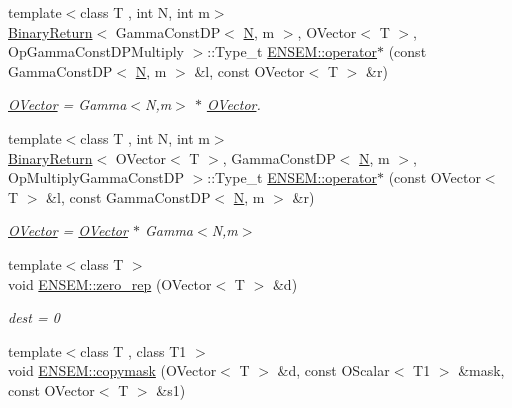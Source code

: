 \begin{DoxyCompactItemize}
{\footnotesize template$<$class T , int N, int m$>$ }\\\mbox{\hyperlink{structBinaryReturn}{Binary\+Return}}$<$ Gamma\+Const\+DP$<$ \mbox{\hyperlink{adat__devel_2lib_2hadron_2operator__name__util_8cc_a7722c8ecbb62d99aee7ce68b1752f337}{N}}, m $>$, O\+Vector$<$ T $>$, Op\+Gamma\+Const\+D\+P\+Multiply $>$\+::Type\+\_\+t \mbox{\hyperlink{group__obsvector_gaa96dcdea35ea89a0405ab2273dfaa9a9}{E\+N\+S\+E\+M\+::operator$\ast$}} (const Gamma\+Const\+DP$<$ \mbox{\hyperlink{adat__devel_2lib_2hadron_2operator__name__util_8cc_a7722c8ecbb62d99aee7ce68b1752f337}{N}}, m $>$ \&l, const O\+Vector$<$ T $>$ \&r)
\begin{DoxyCompactList}\small\item\em \mbox{\hyperlink{classENSEM_1_1OVector}{O\+Vector}} = Gamma$<$\+N,m$>$ $\ast$ \mbox{\hyperlink{classENSEM_1_1OVector}{O\+Vector}}. \end{DoxyCompactList}\item 
{\footnotesize template$<$class T , int N, int m$>$ }\\\mbox{\hyperlink{structBinaryReturn}{Binary\+Return}}$<$ O\+Vector$<$ T $>$, Gamma\+Const\+DP$<$ \mbox{\hyperlink{adat__devel_2lib_2hadron_2operator__name__util_8cc_a7722c8ecbb62d99aee7ce68b1752f337}{N}}, m $>$, Op\+Multiply\+Gamma\+Const\+DP $>$\+::Type\+\_\+t \mbox{\hyperlink{group__obsvector_ga5641b8f1bc373f5f46ec47d9b0640c64}{E\+N\+S\+E\+M\+::operator$\ast$}} (const O\+Vector$<$ T $>$ \&l, const Gamma\+Const\+DP$<$ \mbox{\hyperlink{adat__devel_2lib_2hadron_2operator__name__util_8cc_a7722c8ecbb62d99aee7ce68b1752f337}{N}}, m $>$ \&r)
\begin{DoxyCompactList}\small\item\em \mbox{\hyperlink{classENSEM_1_1OVector}{O\+Vector}} = \mbox{\hyperlink{classENSEM_1_1OVector}{O\+Vector}} $\ast$ Gamma$<$\+N,m$>$ \end{DoxyCompactList}\item 
{\footnotesize template$<$class T $>$ }\\void \mbox{\hyperlink{group__obsvector_gab00fc89904c43c79298da792136d5b8d}{E\+N\+S\+E\+M\+::zero\+\_\+rep}} (O\+Vector$<$ T $>$ \&d)
\begin{DoxyCompactList}\small\item\em dest = 0 \end{DoxyCompactList}\item 
{\footnotesize template$<$class T , class T1 $>$ }\\void \mbox{\hyperlink{group__obsvector_ga36fbe4267e04acd96a7558ca09b16912}{E\+N\+S\+E\+M\+::copymask}} (O\+Vector$<$ T $>$ \&d, const O\+Scalar$<$ T1 $>$ \&mask, const O\+Vector$<$ T $>$ \&s1)

\end{DoxyCompactItemize}
